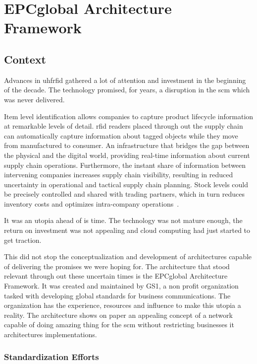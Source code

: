 \chapter{EPCglobal Architecture Framework}

\section{Context}

Advances in \ac{uhfrfid} gathered a lot of attention and investment in the beginning of the decade. The technology promised, for years, a disruption in the \ac{scm} which was never delivered. 

Item level identification allows companies to capture product lifecycle information at remarkable levels of detail. \ac{rfid} readers placed through out the supply chain can automatically capture information about tagged objects while they move from manufactured to consumer.
An infrastructure that bridges the gap between the physical and the digital world, providing real-time information about current supply chain operations.
Furthermore, the instant share of information between intervening companies increases supply chain visibility, resulting in reduced uncertainty in operational and tactical supply chain planning.
Stock levels could be precisely controlled and shared with trading partners, which in turn reduces inventory costs and optimizes intra-company operations~\cite{lorenzDiscoveryServicesEPC2011, simchi-leviCadeiasSuprimentosProjeto2003}.

It was an utopia ahead of is time. The technology was not mature enough, the return on investment was not appealing and cloud computing had just started to get traction.

This did not stop the conceptualization and development of architectures capable of delivering the promises we were hoping for.
The architecture that stood relevant through out these uncertain times is the EPCglobal Architecture Framework.
It was created and maintained by GS1, a non profit organization tasked with developing global standards for business communications.
The organization has the experience, resources and influence to make this utopia a reality.
The architecture shows on paper an appealing concept of a network capable of doing amazing thing for the \ac{scm} without restricting businesses \ac{it} architectures implementations.

\subsection{Standardization Efforts}

